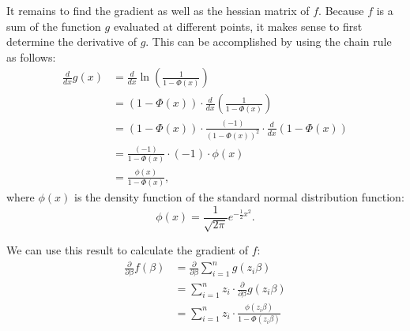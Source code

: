 It remains to find the gradient as well as the hessian matrix of $f$.
Because $f$ is a sum of the function $g$ evaluated at different points,
it makes sense to first determine the derivative of $g$.
This can be accomplished by using the chain rule as follows:
\begin{equation}
    \begin{split}
        \frac{d}{dx}g(x)
        & = \frac{d}{dx} \ln \left(\frac{1}{1 - \Phi(x)}\right)                 \\
        & = (1 - \Phi(x)) \cdot \frac{d}{dx} \left(\frac{1}{1 - \Phi(x)}\right) \\
        & = (1 - \Phi(x)) \cdot \frac{(-1)}{(1 - \Phi(x))^2} \cdot \frac{d}{dx} (1 - \Phi(x)) \\
        & = \frac{(-1)}{1 - \Phi(x)} \cdot (-1) \cdot \phi(x) \\
        & = \frac{\phi(x)}{1 - \Phi(x)},
    \end{split}
\end{equation}
where $\phi(x)$ is the density function of the standard normal distribution function:
\begin{equation*}
    \phi(x) = \frac{1}{\sqrt{2 \pi}} e^{-\frac{1}{2} x^2}.
\end{equation*}

\noindent We can use this result to calculate the gradient of $f$:
\begin{equation}
    \begin{split}
        \frac{\partial}{\partial \beta} f(\beta)
        & = \frac{\partial}{\partial \beta} \sum_{i=1}^n g(z_i \beta) \\
        & = \sum_{i=1}^n z_i \cdot \frac{\partial}{\partial \beta} g(z_i \beta) \\
        & = \sum_{i=1}^n z_i \cdot \frac{\phi(z_i\beta)}{1 - \Phi(z_i \beta)}
    \end{split}
\end{equation}


